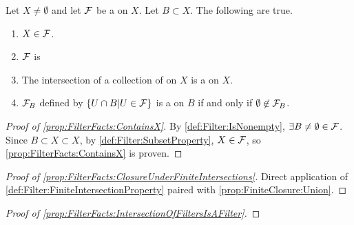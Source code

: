 \begin{prop}
\label{prop:FilterFacts}
\rm
    Let $X \neq \emptyset$ and let $\mathcal{F}$ be a 
    \Filter on $X$. 
    Let $B \subset X$. 
    The following are true. 
    \begin{enumerate}[label=(\roman*), ref={\ref{prop:FilterFacts}~\roman*}]
        \item 
		\label{prop:FilterFacts:ContainsX} 
		$X \in \mathcal{F}$. 
        \item 
		\label{prop:FilterFacts:ClosureUnderFiniteIntersections} 
		$\mathcal{F}$ is \ClosedUnderFiniteIntersections
        \item 
		\label{prop:FilterFacts:IntersectionOfFiltersIsAFilter} 
		The intersection of a collection of 
		\Filters on $X$ is a \Filter on $X$. 
        \item 
		\label{prop:FilterFacts:InducedFilterExistence}
        $\mathcal{F}_B$ defined by $\left\{ U \cap B | U \in \mathcal{F} \right\}$ 
		is a \Filter on $B$ 
        if and only if $\emptyset \not \in \mathcal{F}_B$. 
    \end{enumerate}
    \begin{proof}[Proof of \ref{prop:FilterFacts:ContainsX}]
        By \ref{def:Filter:IsNonempty}, 
        $\exists B \neq \emptyset \in \mathcal{F}$. 
        Since $B \subset X \subset X$, by 
        \ref{def:Filter:SubsetProperty}, 
        $X \in \mathcal{F}$, so \ref{prop:FilterFacts:ContainsX} is proven. 
    \end{proof}
    \begin{proof}[Proof of \ref{prop:FilterFacts:ClosureUnderFiniteIntersections}]
	
        Direct application of \ref{def:Filter:FiniteIntersectionProperty} paired with 
        \ref{prop:FiniteClosure:Union}.
    \end{proof}
    \begin{proof}[Proof of \ref{prop:FilterFacts:IntersectionOfFiltersIsAFilter}]
	

\end{proof}
\end{prop}
